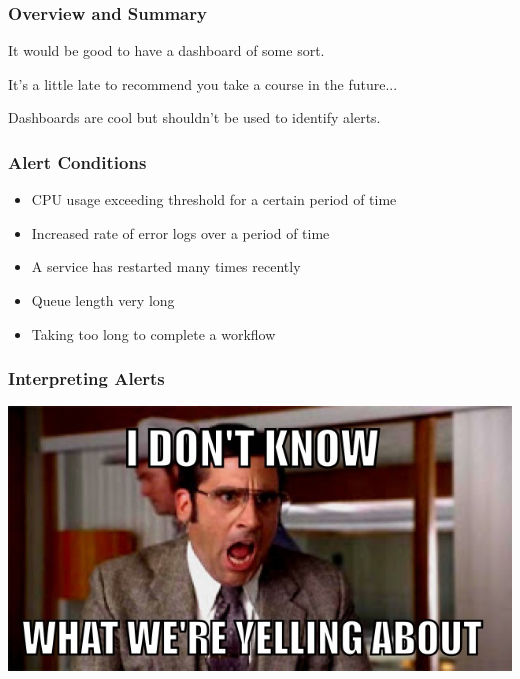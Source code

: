 \begin{frame}
\frametitle{Overview and Summary}

It would be good to have a dashboard of some sort.

It's a little late to recommend you take a course in the future...

Dashboards are cool but shouldn't be used to identify alerts.

\end{frame}


\begin{frame}
\frametitle{Alert Conditions}

\begin{itemize}
	\item CPU usage exceeding threshold for a certain period of time
	\item Increased rate of error logs over a period of time
	\item A service has restarted many times recently
	\item Queue length very long
	\item Taking too long to complete a workflow
\end{itemize}

\end{frame}


\begin{frame}
\frametitle{Interpreting Alerts}

\begin{center}
	\includegraphics[width=\textwidth]{images/whyyelling.png}
\end{center}


\end{frame}





